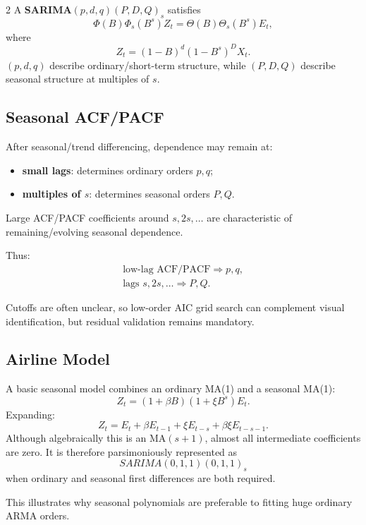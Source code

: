 \documentclass[9pt,a4paper]{extarticle}
\newcommand{\key}[1]{\textbf{#1}}
\begin{document}
\begin{multicols}{2}
A \key{SARIMA\((p,d,q)(P,D,Q)_s\)} satisfies
\[
\boxed{
\Phi(B)\Phi_s(B^s)Z_t=
\Theta(B)\Theta_s(B^s)E_t,
}
\]
where
\[
Z_t=(1-B)^d(1-B^s)^DX_t.
\]
\((p,d,q)\) describe ordinary/short-term structure, while \((P,D,Q)\) describe seasonal structure at multiples of \(s\).

\subsection{Seasonal ACF/PACF}

After seasonal/trend differencing, dependence may remain at:
\begin{itemize}
\item \key{small lags}: determines ordinary orders \(p,q\);
\item \key{multiples of \(s\)}: determines seasonal orders \(P,Q\).
\end{itemize}

Large ACF/PACF coefficients around \(s,2s,\ldots\) are characteristic of remaining/evolving seasonal dependence.

Thus:
\[
\boxed{
\begin{array}{l}
\text{low-lag ACF/PACF}\Rightarrow p,q,\\
\text{lags }s,2s,\ldots\Rightarrow P,Q.
\end{array}}
\]

Cutoffs are often unclear, so low-order AIC grid search can complement visual identification, but residual validation remains mandatory.

\subsection{Airline Model}

A basic seasonal model combines an ordinary MA(1) and a seasonal MA(1):
\[
Z_t=(1+\beta B)(1+\xi B^s)E_t.
\]
Expanding:
\[
\boxed{
Z_t=E_t+\beta E_{t-1}
+\xi E_{t-s}
+\beta\xi E_{t-s-1}.
}
\]
Although algebraically this is an MA\((s+1)\), almost all intermediate coefficients are zero. It is therefore parsimoniously represented as
\[
\boxed{SARIMA(0,1,1)(0,1,1)_s}
\]
when ordinary and seasonal first differences are both required.

This illustrates why seasonal polynomials are preferable to fitting huge ordinary ARMA orders.


\end{multicols}
\end{document}
